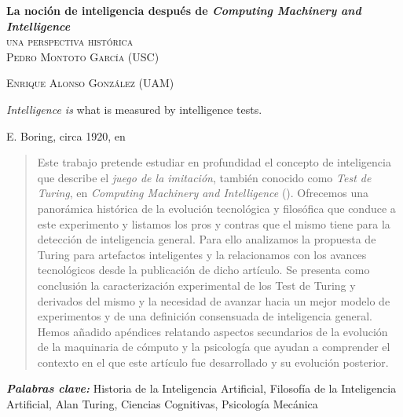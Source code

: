 \documentclass[12pt]{memoir}
\makeatletter
\newlength\drop
\newcommand*\titleM{\begingroup%
\setlength\drop{0.08\textheight}
\centering
\vspace*{\drop}
{\Huge\bfseries La noción de inteligencia después de \textit{Computing Machinery and Intelligence}}\\[\baselineskip]
{\scshape una perspectiva histórica}\\[\baselineskip]
\vfill
{\large\scshape Pedro Montoto García (USC)}\par
{\large\scshape Enrique Alonso González (UAM)}\par
\vfill
{\scshape \@date}\par
\vspace*{2\drop}
\endgroup}
\providecommand{\keywords}[2]{
	\textbf{\textit{#1: }} #2
}
\makeatother
\begin{document}
\pagestyle{empty}


\begin{titlingpage}
\titleM
\end{titlingpage}

\OnehalfSpacing



\setlength{\epigraphwidth}{0.8\textwidth}
\thispagestyle{empty}
\epigraph{\flqq\textit{Intelligence is} what is measured by intelligence tests.\frqq}{E. Boring, circa 1920, en \cite{intDefs}}

\newpage


\thispagestyle{empty}
\begin{abstract}
	Este trabajo pretende estudiar en profundidad el concepto de inteligencia que describe el \textit{juego de la imitación}, también conocido como \textit{Test de Turing}, en \textit{Computing Machinery and Intelligence} (\cite{Turing1950cmi}). Ofrecemos una panorámica histórica de la evolución tecnológica y filosófica que conduce a este experimento y listamos los pros y contras que el mismo tiene para la detección de inteligencia general. Para ello analizamos la propuesta de Turing para artefactos inteligentes y la relacionamos con los avances tecnológicos desde la publicación de dicho artículo. Se presenta como conclusión la caracterización experimental de los Test de Turing y derivados del mismo y la necesidad de avanzar hacia un mejor modelo de experimentos y de una definición consensuada de inteligencia general. Hemos añadido apéndices relatando aspectos secundarios de la evolución de la maquinaria de cómputo y la psicología que ayudan a comprender el contexto en el que este artículo fue desarrollado y su evolución posterior.
\end{abstract}

\nocite{Nilsson2009}

\keywords{Palabras clave}{Historia de la Inteligencia Artificial, Filosofía de la Inteligencia Artificial, Alan Turing, Ciencias Cognitivas, Psicología Mecánica}
\end{document}
